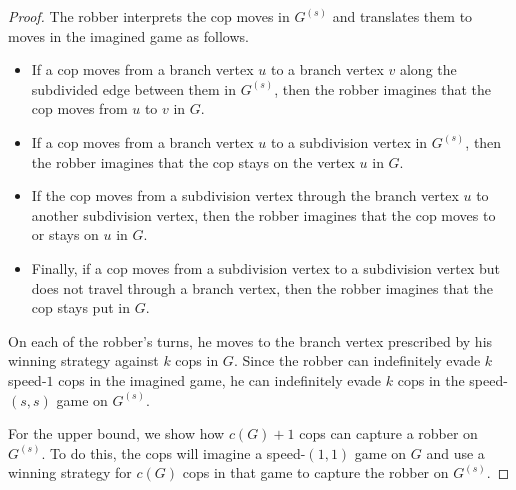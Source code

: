 \documentclass[10pt,a4paper]{amsart}
\begin{document}
\begin{proof}
    The robber interprets the cop moves in $G^{(s)}$ and translates them to moves in the imagined game as follows.
    \begin{itemize}
        \item 
            If a cop moves from a branch vertex $u$ to a branch vertex $v$ along the subdivided edge between them in $G^{(s)}$, then the robber imagines that the cop moves from $u$ to $v$ in $G$.  %
        \item
            If a cop moves from a branch vertex $u$ to a subdivision vertex in $G^{(s)}$, then the robber imagines that the cop stays on the vertex $u$ in $G$.
        \item
            If the cop moves from a subdivision vertex through the branch vertex $u$ to another subdivision vertex, then the robber imagines that the cop moves to or stays on $u$ in $G$.
        \item
            Finally, if a cop moves from a subdivision vertex to a subdivision vertex but does not travel through a branch vertex, then the robber imagines that the cop stays put in $G$.
    \end{itemize}
    
    On each of the robber's turns, he moves to the branch vertex prescribed by his winning strategy against $k$ cops in $G$.  Since the robber can indefinitely evade $k$ speed-$1$ cops in the imagined game, he can indefinitely evade $k$ cops in the speed-$(s,s)$ game on $G^{(s)}$.

    For the upper bound, we show how $c(G)+1$ cops can capture a robber on $G^{(s)}$.  To do this, the cops will imagine a speed-$(1,1)$ game on $G$ and use a winning strategy for $c(G)$ cops in that game to capture the robber on $G^{(s)}$.


\end{proof}
\end{document}
